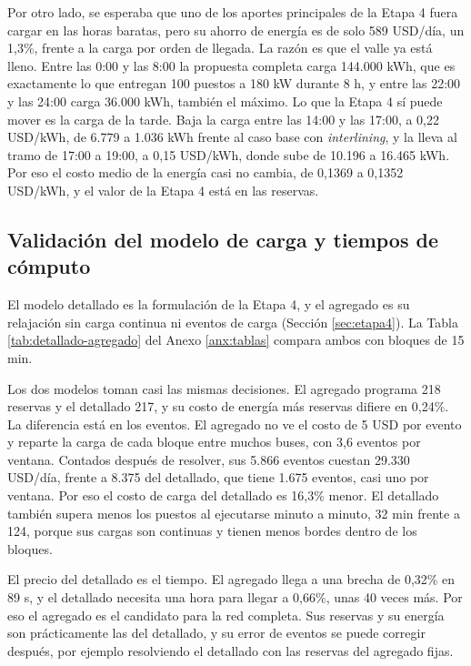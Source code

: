 Por otro lado, se esperaba que uno de los aportes principales de la Etapa 4 fuera cargar en las horas baratas, pero su ahorro de energía es de solo 589 USD/día, un 1,3\%, frente a la carga por orden de llegada. La razón es que el valle ya está lleno. Entre las 0:00 y las 8:00 la propuesta completa carga 144.000 kWh, que es exactamente lo que entregan 100 puestos a 180 kW durante 8 h, y entre las 22:00 y las 24:00 carga 36.000 kWh, también el máximo. Lo que la Etapa 4 sí puede mover es la carga de la tarde. Baja la carga entre las 14:00 y las 17:00, a 0,22 USD/kWh, de 6.779 a 1.036 kWh frente al caso base con \textit{interlining}, y la lleva al tramo de 17:00 a 19:00, a 0,15 USD/kWh, donde sube de 10.196 a 16.465 kWh. Por eso el costo medio de la energía casi no cambia, de 0,1369 a 0,1352 USD/kWh, y el valor de la Etapa 4 está en las reservas.

\subsection{Validación del modelo de carga y tiempos de cómputo}
\label{sec:validacion-carga}

El modelo detallado es la formulación de la Etapa 4, y el agregado es su relajación sin carga continua ni eventos de carga (Sección \ref{sec:etapa4}). La Tabla \ref{tab:detallado-agregado} del Anexo \ref{anx:tablas} compara ambos con bloques de 15 min.

Los dos modelos toman casi las mismas decisiones. El agregado programa 218 reservas y el detallado 217, y su costo de energía más reservas difiere en 0,24\%. La diferencia está en los eventos. El agregado no ve el costo de 5 USD por evento y reparte la carga de cada bloque entre muchos buses, con 3,6 eventos por ventana. Contados después de resolver, sus 5.866 eventos cuestan 29.330 USD/día, frente a 8.375 del detallado, que tiene 1.675 eventos, casi uno por ventana. Por eso el costo de carga del detallado es 16,3\% menor. El detallado también supera menos los puestos al ejecutarse minuto a minuto, 32 min frente a 124, porque sus cargas son continuas y tienen menos bordes dentro de los bloques.

El precio del detallado es el tiempo. El agregado llega a una brecha de 0,32\% en 89 s, y el detallado necesita una hora para llegar a 0,66\%, unas 40 veces más. Por eso el agregado es el candidato para la red completa. Sus reservas y su energía son prácticamente las del detallado, y su error de eventos se puede corregir después, por ejemplo resolviendo el detallado con las reservas del agregado fijas.

